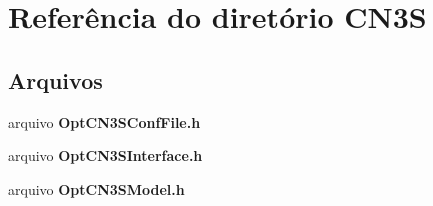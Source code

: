 \section{Referência do diretório C\+N3S}
\label{dir_f26415727c1c1699755264d7b0655a71}
\subsection*{Arquivos}
\begin{DoxyCompactItemize}
\item 
arquivo {\bf Opt\+C\+N3\+S\+Conf\+File.\+h}
\item 
arquivo {\bf Opt\+C\+N3\+S\+Interface.\+h}
\item 
arquivo {\bf Opt\+C\+N3\+S\+Model.\+h}
\end{DoxyCompactItemize}
